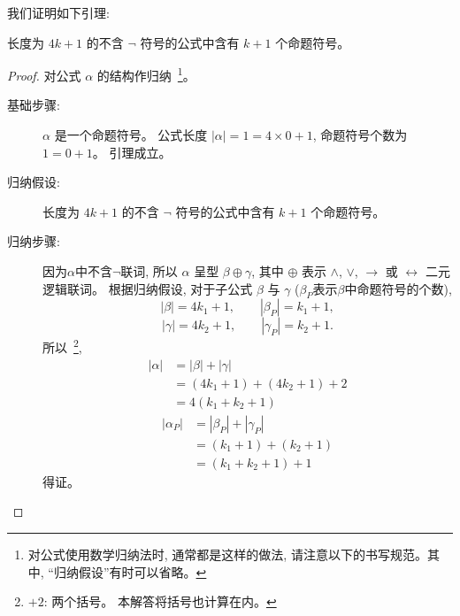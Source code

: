 \documentclass[a4paper, justified]{tufte-handout}
\begin{document}
\begin{solution}
  我们证明如下引理:
  \begin{lemma*}
    长度为 $4k + 1$ 的不含 $\lnot$ 符号的公式中含有 $k + 1$ 个命题符号。
  \end{lemma*}

  \begin{proof}
    对公式 $\alpha$ 的结构作归纳~\footnote{对公式使用数学归纳法时, 通常都是这样的做法,
    请注意以下的书写规范。其中, ``归纳假设''有时可以省略。}。

    \begin{description}
      \item[基础步骤:] $\alpha$ 是一个命题符号。
        公式长度 $|\alpha| = 1 = 4 \times 0 + 1$, 命题符号个数为 $1 = 0 + 1$。 引理成立。
      \item[归纳假设:] 长度为 $4k + 1$ 的不含 $\lnot$ 符号的公式中含有 $k + 1$ 个命题符号。
      \item[归纳步骤:] 因为$\alpha$中不含$\lnot$联词,
        所以 $\alpha$ 呈型 $\beta \oplus \gamma$,
        其中 $\oplus$ 表示 $\land$, $\lor$, $\to$ 或 $\leftrightarrow$ 二元逻辑联词。
        根据归纳假设, 对于子公式 $\beta$ 与 $\gamma$
        ($\beta_{P}$表示$\beta$中命题符号的个数),
        \[
          |\beta| = 4k_{1} + 1, \qquad |\beta_{P}| = k_{1} + 1,
        \]
        \[
          |\gamma| = 4k_{2} + 1, \qquad |\gamma_{P}| = k_{2} + 1.
        \]
        所以~\footnote{$+2$: 两个括号。 本解答将括号也计算在内。},
        \begin{align*}
          |\alpha| &= |\beta| + |\gamma| \\
                   &= (4k_{1} + 1) + (4k_{2} + 1) + 2 \\
                   &= 4(k_{1} + k_{2} + 1)
        \end{align*}
        \begin{align*}
          |\alpha_{P}| &= |\beta_{P}| + |\gamma_{P}| \\
                   &= (k_{1} + 1) + (k_{2} + 1) \\
                   &= (k_{1} + k_{2} + 1) + 1
        \end{align*}
        得证。
    \end{description}
  \end{proof}
\end{solution}
\end{document}
